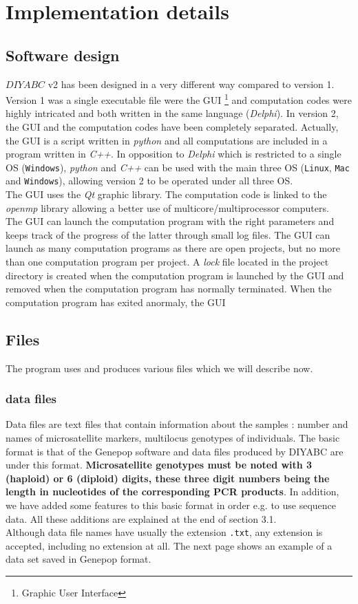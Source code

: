 \clearpage
 \section{Implementation details}
\subsection{Software design}
$DIYABC$ v2 has been designed in a very different way compared to version 1. Version 1 was a single executable file were the GUI \footnote{Graphic User Interface} and computation codes were highly intricated and both written in the same language (\emph{Delphi}). In version 2, the GUI and the computation codes have been completely separated. Actually, the GUI is a script written in \emph{python} and all computations are included in a program written in \emph{C++}. In opposition to \emph{Delphi} which is restricted to a single OS (\texttt{Windows}), \textit{python} and \textit{C++} can be used with the main three OS (\texttt{Linux}, \texttt{Mac} and \texttt{Windows}), allowing version 2  to be operated under all three OS.\\
The GUI uses the \textit{Qt} graphic library. The computation code is linked to the \textit{openmp} library allowing a better use of multicore/multiprocessor computers.\\
The GUI can launch the computation program with the right parameters and keeps track of the progress of the latter through small log files. The GUI can launch as many computation programs as there are open projects, but no more than one computation program per project. A \textit{lock} file located in the project directory is created when the computation program is launched by the GUI and removed when the computation program has normally terminated. When the computation program has exited anormaly, the GUI   
\subsection{Files}
The program uses and produces various files which we will describe now.
\subsubsection{data files}
Data files are text files that contain information about the samples : number and names of microsatellite markers, multilocus genotypes of individuals. The basic  format is that of the Genepop software \citep{RR1995} and data files produced by DIYABC are under this format.  \textbf{Microsatellite genotypes must be noted with 3 (haploid) or 6 (diploid) digits, these three digit numbers being the length in nucleotides of the corresponding PCR products}. In addition, we have added some features to this basic format in order e.g. to use sequence data. All these additions are explained at the end of section 3.1.\\ Although data file names have usually the extension \texttt{.txt}, any extension is accepted, including no extension at all. The next page shows an example of a data set saved in Genepop format.
